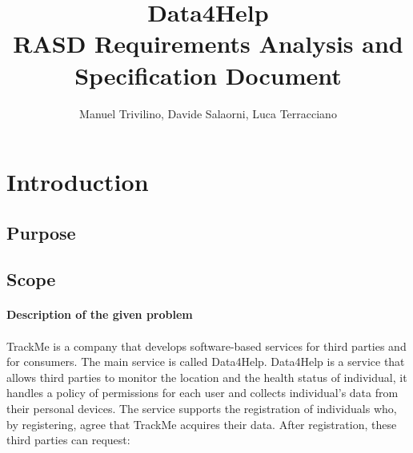 \documentclass[a4paper]{article}
\begin{document}
\author{Manuel Trivilino, Davide Salaorni, Luca Terracciano}

\title{\Large Data4Help\\
\Large RASD Requirements Analysis and Specification Document
}

\maketitle
\newpage

\tableofcontents
\newpage

\section{Introduction}

\subsection{Purpose}

\subsection{Scope}

\paragraph{Description of the given problem}

\paragraph{}
TrackMe is a company that develops software-based services for third parties and for consumers. The main service is called Data4Help.
 Data4Help is a service that allows third parties to monitor the location and the health status of individual, it handles a policy of permissions for each user and collects individual’s data from their personal devices.
The service supports the registration of individuals who, by registering, agree that TrackMe acquires their data. After registration, these third parties can request:
\end{document}
